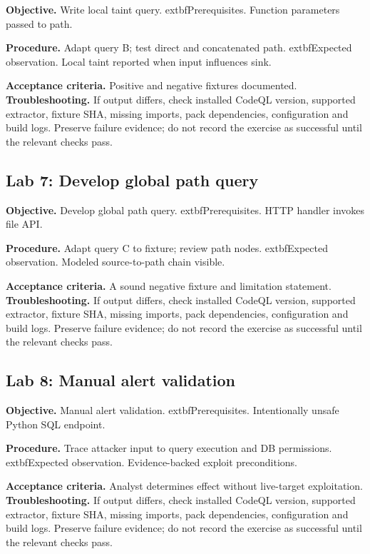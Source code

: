 \documentclass[11pt,letterpaper,oneside]{book}
\begin{document}
\textbf{Objective.} Write local taint query. 	extbf{Prerequisites.} Function parameters passed to path.

\textbf{Procedure.} Adapt query B; test direct and concatenated path. 	extbf{Expected observation.} Local taint reported when input influences sink.

\textbf{Acceptance criteria.} Positive and negative fixtures documented. \textbf{Troubleshooting.} If output differs, check installed CodeQL version, supported extractor, fixture SHA, missing imports, pack dependencies, configuration and build logs. Preserve failure evidence; do not record the exercise as successful until the relevant checks pass.

\subsection{Lab 7: Develop global path query}

\textbf{Objective.} Develop global path query. 	extbf{Prerequisites.} HTTP handler invokes file API.

\textbf{Procedure.} Adapt query C to fixture; review path nodes. 	extbf{Expected observation.} Modeled source-to-path chain visible.

\textbf{Acceptance criteria.} A sound negative fixture and limitation statement. \textbf{Troubleshooting.} If output differs, check installed CodeQL version, supported extractor, fixture SHA, missing imports, pack dependencies, configuration and build logs. Preserve failure evidence; do not record the exercise as successful until the relevant checks pass.

\subsection{Lab 8: Manual alert validation}

\textbf{Objective.} Manual alert validation. 	extbf{Prerequisites.} Intentionally unsafe Python SQL endpoint.

\textbf{Procedure.} Trace attacker input to query execution and DB permissions. 	extbf{Expected observation.} Evidence-backed exploit preconditions.

\textbf{Acceptance criteria.} Analyst determines effect without live-target exploitation. \textbf{Troubleshooting.} If output differs, check installed CodeQL version, supported extractor, fixture SHA, missing imports, pack dependencies, configuration and build logs. Preserve failure evidence; do not record the exercise as successful until the relevant checks pass.
\end{document}
